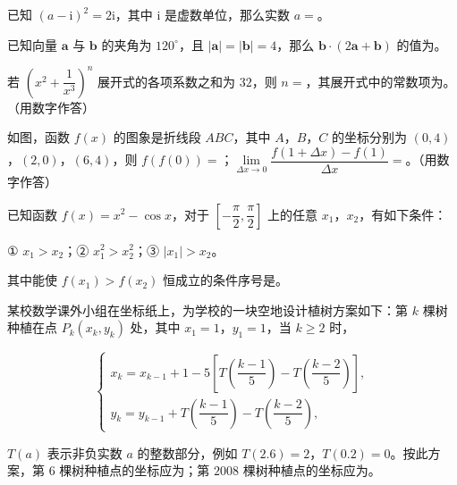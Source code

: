 \begin{question}
已知 $(a-\mathrm i)^2=2\mathrm i$，其中 $\mathrm i$ 是虚数单位，那么实数 $a=$\gkblank{}。

\end{question}
\begin{question}
已知向量 $\boldsymbol a$ 与 $\boldsymbol b$ 的夹角为 $120^\circ$，且 $|\boldsymbol a|=|\boldsymbol b|=4$，那么 $\boldsymbol b\cdot(2\boldsymbol a+\boldsymbol b)$ 的值为\gkblank{}。

\end{question}
\begingroup
\renewenvironment{question}{\Needspace{0.44\textheight}}{}
\begin{question}
若 $\left(x^2+\dfrac1{x^3}\right)^n$ 展开式的各项系数之和为 $32$，则 $n=$\gkblank{}，其展开式中的常数项为\gkblank{}。（用数字作答）

\Needspace{0.4\textheight}
\end{question}
\endgroup
\begin{question}
如图，函数 $f(x)$ 的图象是折线段 $ABC$，其中 $A$，$B$，$C$ 的坐标分别为 $(0,4)$，$(2,0)$，$(6,4)$，则 $f(f(0))=$\gkblank{}；$\lim\limits_{\Delta x\to0}\dfrac{f(1+\Delta x)-f(1)}{\Delta x}=$\gkblank{}。（用数字作答）
\nopagebreak[4]
\begin{center}\end{center}
\nopagebreak[4]
\end{question}
\begin{question}
已知函数 $f(x)=x^2-\cos x$，对于 $\left[-\dfrac{\pi}2,\dfrac{\pi}2\right]$ 上的任意 $x_1$，$x_2$，有如下条件：

① $x_1>x_2$；② $x_1^2>x_2^2$；③ $|x_1|>x_2$。

其中能使 $f(x_1)>f(x_2)$ 恒成立的条件序号是\gkblank{}。

\end{question}
\begin{question}
某校数学课外小组在坐标纸上，为学校的一块空地设计植树方案如下：第 $k$ 棵树种植在点 $P_k(x_k,y_k)$ 处，其中 $x_1=1$，$y_1=1$，当 $k\geqslant2$ 时，

\nopagebreak[4]
\[\begin{cases}x_k=x_{k-1}+1-5\left[T\left(\dfrac{k-1}5\right)-T\left(\dfrac{k-2}5\right)\right],\\ y_k=y_{k-1}+T\left(\dfrac{k-1}5\right)-T\left(\dfrac{k-2}5\right),\end{cases}\]

$T(a)$ 表示非负实数 $a$ 的整数部分，例如 $T(2.6)=2$，$T(0.2)=0$。按此方案，第 $6$ 棵树种植点的坐标应为\gkblank{}；第 $2008$ 棵树种植点的坐标应为\gkblank{}。

\end{question}


